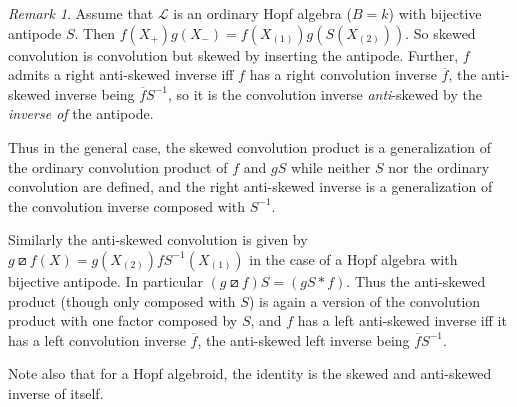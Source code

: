\documentclass[a4paper,reqno]{amsart}
\numberwithin{equation}{section}
\theoremstyle{plain}
\theoremstyle{remark}
\newtheorem{rem}[thm]{Remark}
\numberwithin{equation}{section}
\newcommand\inv{^{-1}}
\newcommand\ol{\overline}
\renewcommand{\o}{{}_{\scriptscriptstyle{(1)}}}
\renewcommand{\t}{{}_{\scriptscriptstyle{(2)}}}
\newcommand{\CL}{\mathcal{L}}
\newcommand\askpr{\boxslash}
\begin{document}
\begin{rem}
 Assume that $\CL$ is an ordinary Hopf algebra ($B=k$) with bijective antipode $S$. Then $f(X_+)g(X_-)=f(X\o)g(S(X\t))$. So skewed convolution is convolution but skewed by inserting the antipode. Further, $f$ admits a right anti-skewed inverse iff $f$ has a right convolution inverse $\ol f$, the anti-skewed inverse being $\ol f S\inv$, so it is the convolution inverse \emph{anti}-skewed by the \emph{inverse of} the antipode.
    
    Thus in the general case, the skewed convolution product is a generalization of the ordinary convolution product of $f$ and $gS$ while neither $S$ nor the ordinary convolution are defined, and the right anti-skewed inverse is a generalization of the convolution inverse composed with $S\inv$.

    Similarly the anti-skewed convolution is given by 
    $g\askpr f(X)=g(X\t)fS\inv(X\o)$ in the case of a Hopf algebra with bijective antipode. In particular $(g\askpr f)S=(gS*f).$ Thus the anti-skewed product (though only composed with $S$) is again a version of the convolution product with one factor composed by $S$, and $f$ has a left anti-skewed inverse iff it has a left convolution inverse $\ol f$, the anti-skewed left inverse being $\ol fS\inv$.

    
    Note also that for a Hopf algebroid,  the identity is the skewed and anti-skewed inverse of itself.
\end{rem}
\end{document}
